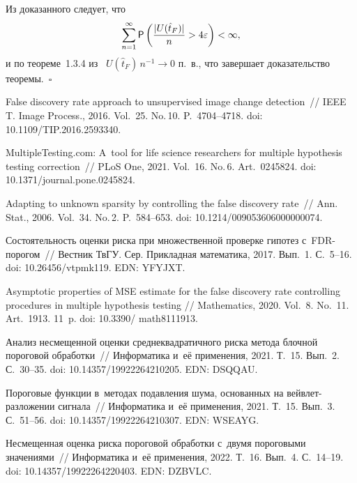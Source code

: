 \begin{multicols}{2}
Из доказанного следует, что
$$
\sum\limits_{n=1}^{\infty}{\sf P} \left( \displaystyle\frac{\displaystyle |U(\hat{t}_F)|\mathstrut}{\displaystyle n\mathstrut}> 4\varepsilon \right) 
< \infty,
$$
и по теореме~1.3.4 из~\cite{Serfling2002} $U(\hat{t}_F) \, n^{-1} \to 0$ п.~в., 
что завершает доказательство теоремы.~\hfill$\square$



{\small\frenchspacing
 {\baselineskip=11.5pt
 \begin{thebibliography}{99}
False discovery rate approach to unsupervised image change detection~// IEEE 
T. Image Process., 2016. Vol.~25. No.\,10. P.~4704--4718. doi: 10.1109/TIP.2016.2593340.

MultipleTesting.com: A~tool for life science researchers for multiple hypothesis 
testing correction~// PLoS One, 2021. Vol.~16. No.\,6. Art.~0245824. doi: 10.1371/journal.pone.0245824.

Adapting to unknown sparsity by controlling the false discovery rate~// Ann. Stat., 2006. Vol.~34. No.\,2. P.~584--653.
doi: 10.1214/009053606000000074.

Состоятельность оценки риска при множественной проверке гипотез с~FDR-по\-ро\-гом~// 
Вестник ТвГУ. Сер. Прикладная математика, 2017. Вып.~1. С.~5--16.
doi: 10.26456/vtpmk119. EDN: YFYJXT.

Asymptotic properties of MSE estimate for the false discovery rate controlling 
procedures in multiple hypothesis testing // Mathematics, 2020. Vol.~8. No.~11. 
Art.~1913. 11~p. doi: 10.3390/ math8111913.

Анализ несмещенной оценки среднеквадратичного риска метода блочной пороговой 
обработки~// Информатика и~её применения, 2021. Т.~15. Вып.~2. С.~30--35.
doi: 10.14357/19922264210205. EDN: DSQQAU.

Пороговые функции в~методах подавления шума, основанных на вейв\-лет-раз\-ло\-же\-нии 
сигнала~// Информатика и~её применения, 2021. Т.~15. Вып.~3. С.~51--56.
doi: 10.14357/19922264210307. EDN: WSEAYG.

Несмещенная оценка риска пороговой обработки с~двумя пороговыми значениями~// 
Информатика и~её применения, 2022. Т.~16. Вып.~4. С.~14--19.
doi: 10.14357/19922264220403. EDN: \mbox{DZBVLC}.


\end{thebibliography}}}
\end{multicols}
